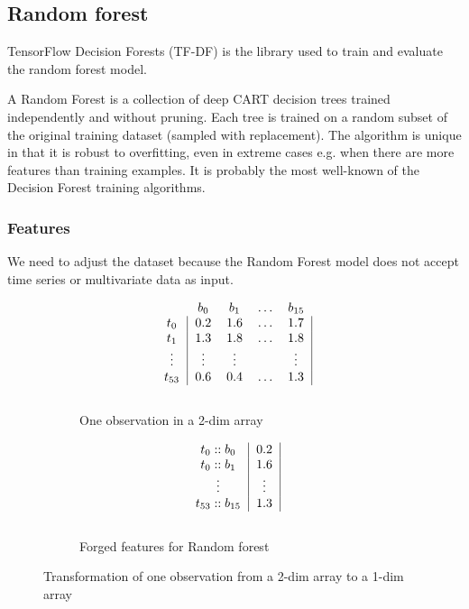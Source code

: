 \subsection{Random forest}
TensorFlow Decision Forests (TF-DF) is the library used to train and evaluate the random forest model.

A Random Forest is a collection of deep CART decision trees trained independently and without pruning.
Each tree is trained on a random subset of the original training dataset (sampled with replacement).
The algorithm is unique in that it is robust to overfitting, even in extreme cases e.g. when there are more features than training examples.
It is probably the most well-known of the Decision Forest training algorithms.

\subsubsection{Features}
We need to adjust the dataset because the Random Forest model does not accept time series or multivariate data as input.

\begin{figure}[!htbp]
  \begin{subfigure}{.5\textwidth}
    \centering
    \[
      \begin{blockarray}{ccccc}
        & b_0 & b_1 & \dots & b_{15} \\
        \begin{block}{c|cccc|}
          t_0 & 0.2 & 1.6 & \dots & 1.7  \\
          t_1 & 1.3 & 1.8 & \dots & 1.8 \\
          \vdots & \vdots & \vdots &  & \vdots   \\
          t_{53} & 0.6 & 0.4 & \dots & 1.3 \\
        \end{block}
      \end{blockarray}
    \]
    \caption{One observation in a 2-dim array}
    \label{fig:figtrans1}
  \end{subfigure}%
  \begin{subfigure}{.5\textwidth}
    \centering
    \[
      \begin{blockarray}{cc}
      \begin{block}{c|c|}
        t_0::b_0 & 0.2 \\
        t_0::b_1 & 1.6 \\
        \vdots & \vdots \\
        t_{53}::b_{15} & 1.3 \\
      \end{block}
      \end{blockarray}
    \]
    \caption{Forged features for Random forest}
    \label{fig:figtrans2}
  \end{subfigure}
  \caption{Transformation of one observation from a 2-dim array to a 1-dim array}
  \label{fig:figtrans}
\end{figure}

